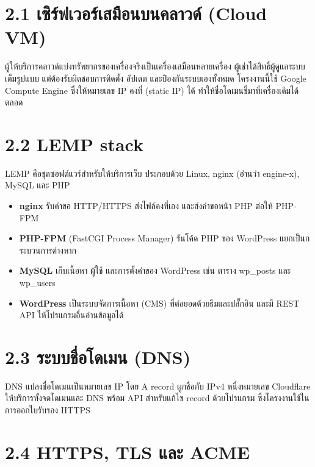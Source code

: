 
\section*{2.1 เซิร์ฟเวอร์เสมือนบนคลาวด์ (Cloud VM)}

ผู้ให้บริการคลาวด์แบ่งทรัพยากรของเครื่องจริงเป็นเครื่องเสมือนหลายเครื่อง ผู้เช่าได้สิทธิ์ผู้ดูแลระบบเต็มรูปแบบ แต่ต้องรับผิดชอบการติดตั้ง อัปเดต และป้องกันระบบเองทั้งหมด โครงงานนี้ใช้ Google Compute Engine ซึ่งให้หมายเลข IP คงที่ (static IP) ได้ ทำให้ชื่อโดเมนชี้มาที่เครื่องเดิมได้ตลอด

\section*{2.2 LEMP stack}

LEMP คือชุดซอฟต์แวร์สำหรับให้บริการเว็บ ประกอบด้วย Linux, nginx (อ่านว่า engine-x), MySQL และ PHP

\begin{itemize}
\tightlist
\item
  \textbf{nginx} รับคำขอ HTTP/HTTPS ส่งไฟล์คงที่เอง และส่งคำขอหน้า PHP ต่อให้ PHP-FPM
\item
  \textbf{PHP-FPM} (FastCGI Process Manager) รันโค้ด PHP ของ WordPress แยกเป็นกระบวนการต่างหาก
\item
  \textbf{MySQL} เก็บเนื้อหา ผู้ใช้ และการตั้งค่าของ WordPress เช่น ตาราง wp\_posts และ wp\_users
\item
  \textbf{WordPress} เป็นระบบจัดการเนื้อหา (CMS) ที่ต่อยอดด้วยธีมและปลั๊กอิน และมี REST API ให้โปรแกรมอื่นอ่านข้อมูลได้
\end{itemize}

\section*{2.3 ระบบชื่อโดเมน (DNS)}

DNS แปลงชื่อโดเมนเป็นหมายเลข IP โดย A record ผูกชื่อกับ IPv4 หนึ่งหมายเลข Cloudflare ให้บริการทั้งจดโดเมนและ DNS พร้อม API สำหรับแก้ไข record ด้วยโปรแกรม ซึ่งโครงงานใช้ในการออกใบรับรอง HTTPS

\section*{2.4 HTTPS, TLS และ ACME}

